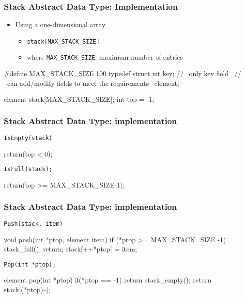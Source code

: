 \documentclass[newPxFont,sthlmFooter,nooffset]{beamer}
\begin{document}
\begin{frame}[t, fragile]
  \frametitle{Stack Abstract Data Type: Implementation}
  \begin{itemize}
  \item Using a one-dimensional array
    \begin{itemize}
    \item \texttt{stack[MAX\_STACK\_SIZE]}
    \item where \texttt{MAX\_STACK\_SIZE}: maximum number of entries
    \end{itemize}
  \end{itemize}
\begin{ncodedef}
#define MAX_STACK_SIZE  100
typedef struct {
    int key; // ~only key field~
             // ~can add/modify fields to meet the requirements~
} element;

element stack[MAX_STACK_SIZE];
int top = -1;
\end{ncodedef}
\end{frame}


\begin{frame}[t, fragile]
  \frametitle{Stack Abstract Data Type: implementation}
\texttt{IsEmpty(stack)}
  \begin{codedef}
    return(top < 0);
  \end{codedef}

\texttt{IsFull(stack);}

  \begin{codedef}
    return(top >= MAX_STACK_SIZE-1);
  \end{codedef}

\end{frame}


\begin{frame}[t, fragile]
  \frametitle{Stack Abstract Data Type: implementation}
\texttt{Push(stack, item)}

  \begin{codedef}
void push(int *ptop, element item){
    if (*ptop >= MAX_STACK_SIZE -1) {
       stack_full();
       return;
    }
    stack[++*ptop] = item;    
}
  \end{codedef}


\texttt{Pop(int *ptop);}

  \begin{codedef}
element pop(int *ptop){
    if(*ptop == -1)
        return stack_empty();
    return stack[(*ptop)--];
}
  \end{codedef}

\end{frame}
\end{document}
